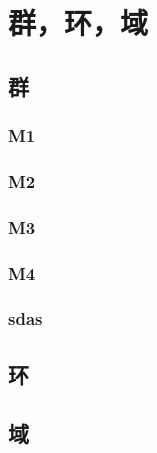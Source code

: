 \section{群，环，域}
\subsection{群}
\subsubsection{M1}
\subsubsection{M2}
\subsubsection{M3}
\subsubsection{M4}
\subsubsection{sdas}
\subsection{环}
\subsection{域}
